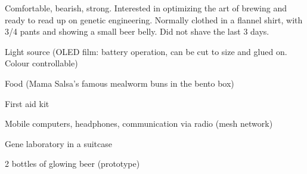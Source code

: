 \begin{npcBox}[title=The Barrel]
    \begin{consequences}
    \item {}
    \item {}
    \item {}
    \end{consequences}

    \begin{npcDescription}
    Comfortable, bearish, strong. Interested in optimizing the art of brewing and ready to read up on genetic engineering. Normally clothed in a flannel shirt, with 3/4 pants and showing a small beer belly. Did not shave the last 3 days.
    \end{npcDescription}


    \begin{equipment}
    \item Light source (OLED film: battery operation, can be cut to size and glued on. Colour controllable)
    \item Food (Mama Salsa's famous mealworm buns in the bento box)
    \item First aid kit
    \item Mobile computers, headphones, communication via radio (mesh network)
    \item Gene laboratory in a suitcase
    \item 2 bottles of glowing beer (prototype)
    \end{equipment}
\end{npcBox}


